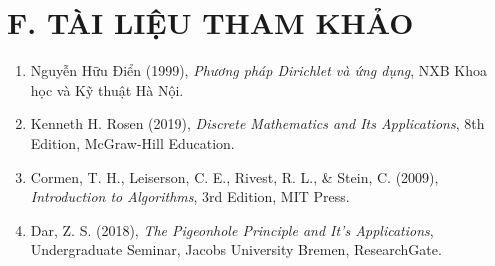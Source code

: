 \documentclass[12pt,a4paper]{article}
\theoremstyle{definition}
\begin{document}
\newpage

\section*{F. TÀI LIỆU THAM KHẢO}

\begin{enumerate}[leftmargin=1.5cm]
    \item Nguyễn Hữu Điển (1999), \textit{Phương pháp Dirichlet và ứng dụng}, NXB Khoa học và Kỹ thuật Hà Nội.
    \item Kenneth H. Rosen (2019), \textit{Discrete Mathematics and Its Applications}, 8th Edition, McGraw-Hill Education.
    \item Cormen, T. H., Leiserson, C. E., Rivest, R. L., \& Stein, C. (2009), \textit{Introduction to Algorithms}, 3rd Edition, MIT Press.
    \item Dar, Z. S. (2018), \textit{The Pigeonhole Principle and It's Applications}, Undergraduate Seminar, Jacobs University Bremen, ResearchGate.
\end{enumerate}
\end{document}
